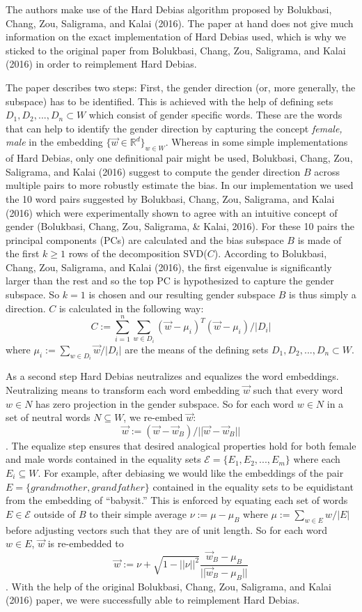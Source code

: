\documentclass[
  english,
  man,floatsintext]{apa6}
\begin{document}
The authors make use of the Hard Debias algorithm proposed by Bolukbasi, Chang, Zou, Saligrama, and Kalai (2016). The paper at hand does not give much information on the exact implementation of Hard Debias used, which is why we sticked to the original paper from Bolukbasi, Chang, Zou, Saligrama, and Kalai (2016) in order to reimplement Hard Debias.

The paper describes two steps: First, the gender direction (or, more generally, the subspace) has to be identified. This is achieved with the help of defining sets \(D_1, D_2, ..., D_n \subset W\) which consist of gender specific words. These are the words that can help to identify the gender direction by capturing the concept \emph{female, male} in the embedding \(\{\vec{w}\in\mathbb{R}^d\}_{w\in W}\). Whereas in some simple implementations of Hard Debias, only one definitional pair might be used, Bolukbasi, Chang, Zou, Saligrama, and Kalai (2016) suggest to compute the gender direction \(B\) across multiple pairs to more robustly estimate the bias. In our implementation we used the 10 word pairs suggested by Bolukbasi, Chang, Zou, Saligrama, and Kalai (2016) which were experimentally shown to agree with an intuitive concept of gender (Bolukbasi, Chang, Zou, Saligrama, \& Kalai, 2016). For these 10 pairs the principal components (PCs) are calculated and the bias subspace \(B\) is made of the first \(k \geq 1\) rows of the decomposition SVD(\(C\)). According to Bolukbasi, Chang, Zou, Saligrama, and Kalai (2016), the first eigenvalue is significantly larger than the rest and so the top PC is hypothesized to capture the gender subspace. So \(k=1\) is chosen and our resulting gender subspace \(B\) is thus simply a direction. \(C\) is calculated in the following way: \[C:=\sum_{i=1}^n \sum_{w\in D_i}(\vec{w}-\mu_i)^T(\vec{w}-\mu_i)/|D_i|\] where \(\mu_i := \sum_{w\in D_i}\vec{w}/|D_i|\) are the means of the defining sets \(D_1, D_2, ..., D_n \subset W\).

As a second step Hard Debias neutralizes and equalizes the word embeddings. Neutralizing means to transform each word embedding \(\vec{w}\) such that every word \(w\in N\) has zero projection in the gender subspace. So for each word \(w\in N\) in a set of neutral words \(N \subseteq W\), we re-embed \(\vec{w}\): \[\vec{w}:=(\vec{w}-\vec{w}_B)/||\vec{w}-\vec{w}_B||\]. The equalize step ensures that desired analogical properties hold for both female and male words contained in the equality sets \(\mathcal{E}=\{E_1,E_2,...,E_m\}\) where each \(E_i \subseteq W\). For example, after debiasing we would like the embeddings of the pair \(E=\{grandmother, grandfather\}\) contained in the equality sets to be equidistant from the embedding of ``babysit.'' This is enforced by equating each set of words \(E\in \mathcal{E}\) outside of \(B\) to their simple average \(\nu:=\mu-\mu_B\) where \(\mu:=\sum_{w\in E}w/|E|\) before adjusting vectors such that they are of unit length. So for each word \(w\in E\), \(\vec{w}\) is re-embedded to \[\vec{w}:=\nu+\sqrt{1-||\nu||^2}\frac{\vec{w}_B-\mu_B}{||\vec{w}_B-\mu_B||}\].
With the help of the original Bolukbasi, Chang, Zou, Saligrama, and Kalai (2016) paper, we were successfully able to reimplement Hard Debias.
\end{document}
